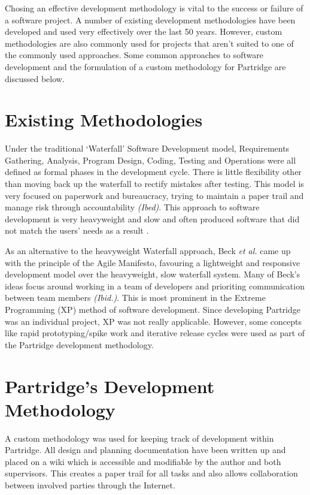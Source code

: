 Chosing an effective development methodology is vital to the
success or failure of a software project. A number of existing development
methodologies have been developed and used very effectively over the last 50
years. However, custom methodologies are also commonly used for projects that
aren't suited to one of the commonly used approaches. Some common approaches to
software development and the formulation of a custom methodology for Partridge
are discussed below.

\section{Existing Methodologies} 

Under the traditional `Waterfall' Software Development model, Requirements
Gathering, Analysis, Program Design, Coding, Testing and Operations were all
defined as formal phases in the development cycle. There is little flexibility
other than moving back up the waterfall to rectify mistakes after
testing\cite{Royce:1987:MDL:41765.41801}. This model is very focused on
paperwork and bureaucracy, trying to maintain a paper trail and manage risk
through accountability \emph{(Ibed)}. This approach to software development is
very heavyweight and slow and often produced software that did not match the
users' needs as a result \cite{Boehm1988}.

As an alternative to the heavyweight Waterfall approach, Beck \emph{et al.}
came up with the principle of the Agile Manifesto, favouring a lightweight and
responsive development model over the heavyweight, slow waterfall
system\cite{beck2001agile}. Many of Beck's ideas focus around working in a team
of developers and prioriting communication between team members \emph{(Ibid.)}.
This is most prominent in the Extreme Programming (XP) method of software
development. Since developing Partridge was an individual project, XP was not
really applicable. However, some concepts like rapid prototyping/spike work and
iterative release cycles were used as part of the Partridge development
methodology.

\section{ Partridge's Development Methodology}

A custom methodology was used for keeping track of development within
Partridge.  All design and planning documentation have been written up and
placed on a wiki which is accessible and modifiable by the author and both
supervisors. This creates a paper trail for all tasks and also allows
collaboration between involved parties through the Internet.

